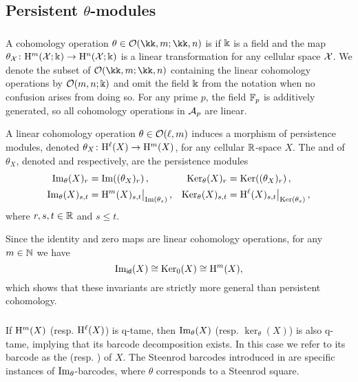 
\subsection{Persistent $\theta$-modules}

\subsubsection{}\label{ss:theta-modules}

A cohomology operation $\theta \in \cO(\kk,m; \kk,n)$ is  if \(\Bbbk\) is a field and the map \(\theta_{\mathcal{X}} \colon \mathrm{H}^m(\mathcal{X}; \Bbbk) \to \mathrm{H}^n(\mathcal{X}; \Bbbk)\) is a linear transformation for any cellular space \(\mathcal{X}\).
We denote the subset of $\cO(\kk,m; \kk,n)$ containing the linear cohomology operations by $\mathcal{O}(m,n;\Bbbk)$ and omit the field \(\Bbbk\) from the notation when no confusion arises from doing so.
For any prime $p$, the field ${\mathbb{F}_p}$ is additively generated, so all cohomology operations in $\mathcal{A}_p$ are linear.

A linear cohomology operation \(\theta \in \mathcal{O}(\ell, m)\) induces a morphism of persistence modules, denoted \(\theta_X \colon \mathrm{H}^\ell(X) \to \mathrm{H}^m(X)\), for any cellular \(\mathbb{R}\)-space \(X\).
The  and  of $\theta_X$, denoted  and  respectively, are the persistence modules
\begin{align*}
	\operatorname{Im}_\theta(X)_r &= \operatorname{Im}((\theta_X)_r)\,, &
	\operatorname{Ker}_\theta(X)_r &= \operatorname{Ker}((\theta_X)_r)\,, \\
	\operatorname{Im}_\theta(X)_{s,t} &= \mathrm{H}^m(X)_{s,t}\big|_{\operatorname{Im}(\theta_s)}\,, &
	\operatorname{Ker}_\theta(X)_{s,t} &= \mathrm{H}^\ell(X)_{s,t}\big|_{\operatorname{Ker}(\theta_s)}\,,
\end{align*}
where \(r, s, t \in \mathbb{R}\) and \(s \leq t\).

Since the identity and zero maps are linear cohomology operations, for any \(m \in \mathbb{N}\) we have
\[
\operatorname{Im}_{\mathsf{id}}(X) \cong \operatorname{Ker}_0(X) \cong \mathrm{H}^m(X),
\]
which shows that these invariants are strictly more general than persistent cohomology.

\subsubsection{}\label{ss:theta-modules-q-tame}

If \(\mathrm{H}^m(X)\) (resp. \(\mathrm{H}^\ell(X)\)) is q-tame, then \(\operatorname{Im}_\theta(X)\) (resp. \(\ker_\theta(X)\)) is also q-tame, implying that its barcode decomposition exists.
In this case we refer to its barcode as the  (resp. ) of \(X\).
The Steenrod barcodes introduced in \cite{medina2022per_st} are specific instances of \(\operatorname{Im}_\theta\)-barcodes, where \(\theta\) corresponds to a Steenrod square.
